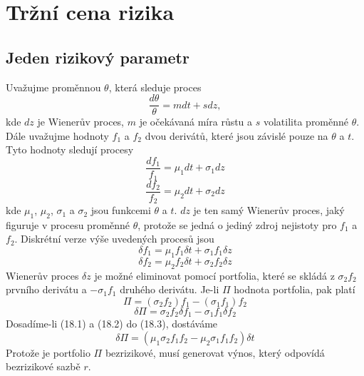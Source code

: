 \documentclass[a4paper]{book}
\begin{document}
\section{Tržní cena rizika}

\subsection{Jeden rizikový parametr}

Uvažujme proměnnou $\theta$, která sleduje proces
\begin{equation*}
\frac{d \theta}{\theta}=mdt + sdz,
\end{equation*}
kde $dz$ je Wienerův proces, $m$ je očekávaná míra růstu a $s$ volatilita proměnné $\theta$. Dále uvažujme hodnoty $f_1$ a $f_2$ dvou derivátů, které jsou závislé pouze na $\theta$ a $t$. Tyto hodnoty sledují procesy
\begin{equation*}
\frac{d f_1}{f_1}=\mu_1 dt + \sigma_1 dz
\end{equation*}
\begin{equation*}
\frac{d f_2}{f_2}=\mu_2 dt + \sigma_2 dz
\end{equation*}
kde $\mu_1$, $\mu_2$, $\sigma_1$ a $\sigma_2$ jsou funkcemi $\theta$ a $t$. $dz$ je ten samý Wienerův proces, jaký figuruje v procesu proměnné $\theta$, protože se jedná o jediný zdroj nejistoty pro $f_1$ a $f_2$. Diskrétní verze výše uvedených procesů jsou
\begin{equation}
\delta f_1 = \mu_1 f_1 \delta t + \sigma_1 f_1 \delta z
\end{equation}
\begin{equation}
\delta f_2 = \mu_2 f_2 \delta t + \sigma_2 f_2 \delta z 
\end{equation}
Wienerův proces $\delta z$ je možné eliminovat pomocí portfolia, které se skládá z $\sigma_2 f_2$ prvního derivátu a $-\sigma_1 f_1$ druhého derivátu. Je-li $\Pi$ hodnota portfolia, pak platí
\begin{equation*}
\Pi = (\sigma_2 f_2)f_1 - (\sigma_1 f_1)f_2
\end{equation*}
\begin{equation}
\delta \Pi = \sigma_2 f_2 \delta f_1 - \sigma_1 f_1 \delta f_2
\end{equation}
Dosadíme-li (18.1) a (18.2) do (18.3), dostáváme
\begin{equation}
\delta \Pi = (\mu_1 \sigma_2 f_1 f_2 - \mu_2 \sigma_1 f_1 f_2)\delta t
\end{equation}
Protože je portfolio $\Pi$ bezrizikové, musí generovat výnos, který odpovídá bezrizikové sazbě $r$.
\end{document}
